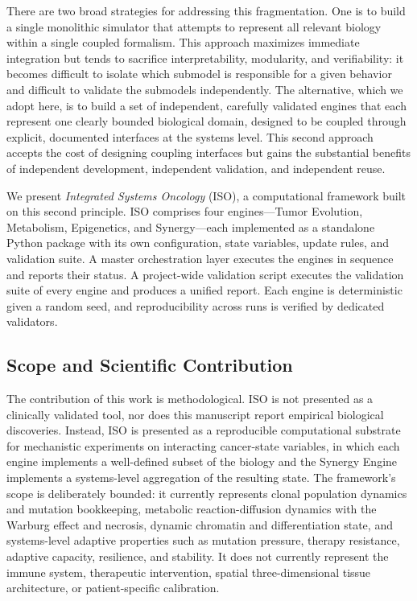 \documentclass[12pt,a4paper]{article}
\begin{document}
There are two broad strategies for addressing this fragmentation. One is to build a single monolithic simulator that attempts to represent all relevant biology within a single coupled formalism. This approach maximizes immediate integration but tends to sacrifice interpretability, modularity, and verifiability: it becomes difficult to isolate which submodel is responsible for a given behavior and difficult to validate the submodels independently. The alternative, which we adopt here, is to build a set of independent, carefully validated engines that each represent one clearly bounded biological domain, designed to be coupled through explicit, documented interfaces at the systems level. This second approach accepts the cost of designing coupling interfaces but gains the substantial benefits of independent development, independent validation, and independent reuse.

We present \textit{Integrated Systems Oncology} (ISO), a computational framework built on this second principle. ISO comprises four engines---Tumor Evolution, Metabolism, Epigenetics, and Synergy---each implemented as a standalone Python package with its own configuration, state variables, update rules, and validation suite. A master orchestration layer executes the engines in sequence and reports their status. A project-wide validation script executes the validation suite of every engine and produces a unified report. Each engine is deterministic given a random seed, and reproducibility across runs is verified by dedicated validators.

\subsection{Scope and Scientific Contribution}

The contribution of this work is methodological. ISO is not presented as a clinically validated tool, nor does this manuscript report empirical biological discoveries. Instead, ISO is presented as a reproducible computational substrate for mechanistic experiments on interacting cancer-state variables, in which each engine implements a well-defined subset of the biology and the Synergy Engine implements a systems-level aggregation of the resulting state. The framework's scope is deliberately bounded: it currently represents clonal population dynamics and mutation bookkeeping, metabolic reaction-diffusion dynamics with the Warburg effect and necrosis, dynamic chromatin and differentiation state, and systems-level adaptive properties such as mutation pressure, therapy resistance, adaptive capacity, resilience, and stability. It does not currently represent the immune system, therapeutic intervention, spatial three-dimensional tissue architecture, or patient-specific calibration.
\end{document}
